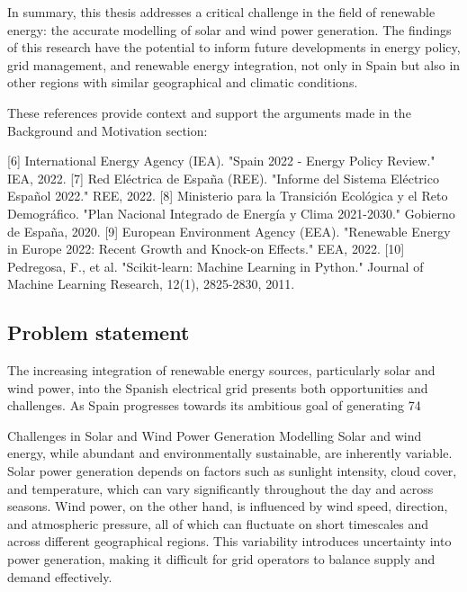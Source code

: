 In summary, this thesis addresses a critical challenge in the field of renewable energy: the accurate modelling of solar and wind power generation. The findings of this research have the potential to inform future developments in energy policy, grid management, and renewable energy integration, not only in Spain but also in other regions with similar geographical and climatic conditions.

These references provide context and support the arguments made in the Background and Motivation section:

[6] International Energy Agency (IEA). "Spain 2022 - Energy Policy Review." IEA, 2022.
[7] Red Eléctrica de España (REE). "Informe del Sistema Eléctrico Español 2022." REE, 2022.
[8] Ministerio para la Transición Ecológica y el Reto Demográfico. "Plan Nacional Integrado de Energía y Clima 2021-2030." Gobierno de España, 2020.
[9] European Environment Agency (EEA). "Renewable Energy in Europe 2022: Recent Growth and Knock-on Effects." EEA, 2022.
[10] Pedregosa, F., et al. "Scikit-learn: Machine Learning in Python." Journal of Machine Learning Research, 12(1), 2825-2830, 2011.

\subsection{Problem statement}
The increasing integration of renewable energy sources, particularly solar and wind power, into the Spanish electrical grid presents both opportunities and challenges. As Spain progresses towards its ambitious goal of generating 74%

Challenges in Solar and Wind Power Generation Modelling
Solar and wind energy, while abundant and environmentally sustainable, are inherently variable. Solar power generation depends on factors such as sunlight intensity, cloud cover, and temperature, which can vary significantly throughout the day and across seasons. Wind power, on the other hand, is influenced by wind speed, direction, and atmospheric pressure, all of which can fluctuate on short timescales and across different geographical regions. This variability introduces uncertainty into power generation, making it difficult for grid operators to balance supply and demand effectively.

